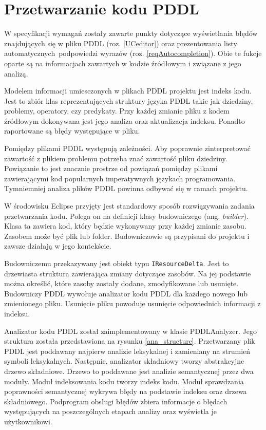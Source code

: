 \section{Przetwarzanie kodu PDDL}
\label{sec:przetwarzanie}
W specyfikacji wymagań zostały zawarte punkty dotyczące wyświetlania błędów znajdujących 
się w pliku PDDL (roz. \ref{UCeditor}) oraz prezentowania listy automatycznych\
podpowiedzi wyrazów (roz. \ref{reqAutocompletion}).
Obie te fukcje oparte są na informacjach zawartych w kodzie źródłowym i związane
z jego analizą.

Modelem informacji umiesczonych w plikach PDDL projektu jest indeks kodu. Jest to
zbiór klas reprezentujących struktury języka PDDL takie jak dziedziny, problemy, operatory, czy predykaty.
Przy każdej zmianie pliku z kodem źródłowym dokonywana jest jego analiza oraz
aktualizacja indeksu. Ponadto raportowane są błędy występujące w pliku.

Pomiędzy plikami PDDL występują zależności. Aby poprawnie zinterpretować zawartość z plikiem
problemu potrzeba znać zawartość pliku dziedziny. Powiązanie to jest znacznie prostrze od 
powiązań pomiędzy plikami zawierającymi kod popularnych imperatywnych językach programowania.
Tymniemniej analiza plików PDDL powinna odbywać się w ramach projektu.

W środowisku Eclipse przyjęty jest standardowy sposób rozwiązywania zadania przetwarzania
kodu. Polega on na definicji klasy budowniczego (ang. \emph{builder}). Klasa ta
zawiera kod, który będzie wykonywany przy każdej zmianie zasobu. Zasobem
może być plik lub folder. Budowniczowie
są przypisani do projektu i zawsze działają w jego kontekście.

Budowniczemu przekazywany jest obiekt typu \texttt{IResourceDelta}. Jest to drzewiasta %
struktura zawierająca zmiany dotyczące zasobów. Na jej podstawie można określić, 
które zasoby zostały dodane, zmodyfikowane lub usunięte. Budowniczy PDDL wywołuje analizator
kodu PDDL dla każdego nowego lub zmienionego pliku. Usunięcie pliku powoduje usunięcie %
odpowiednich informacji z indeksu.


Analizator kodu PDDL został zaimplementowany w klasie PDDLAnalyzer.
Jego struktura została przedstawiona na rysunku \ref{ana_structure}.
Przetwarzany plik PDDL jest poddawany najpierw analizie leksykalnej i zamieniany
na strumień symboli leksykalnych. Następnie, analizator składniowy tworzy abstrakcyjne
drzewo składniowe. Drzewo to poddawane jest analizie semantycznej przez dwa moduły.
Moduł indeksowania kodu tworzy indeks kodu.
Moduł sprawdzania poprawności semantycznej wykrywa błędy na podstawie indeksu oraz
drzewa składniowego. Podprogram obsługi błędów zbiera informacje o błędach występujących
na poszczególnych etapach analizy oraz wyświetla je użytkownikowi.

